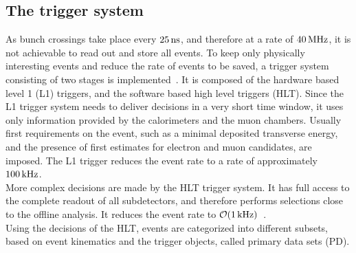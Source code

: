 \subsection{The trigger system}
As bunch crossings take place every $25\,\text{ns}$, and therefore at a rate of $40\,\text{MHz}$, it is not achievable to read out and store all events. To keep only physically interesting events and reduce the rate of events to be saved, a trigger system consisting of two stages is implemented~\cite{TriggerSystem}. It is composed of the hardware based level 1 (L1) triggers, and the software based high level triggers (HLT). Since the L1 trigger system needs to deliver decisions in a very short time window, it uses only information provided by the calorimeters and the muon chambers. Usually first requirements on the event, such as a minimal deposited transverse energy, and  the presence of first estimates for electron and muon candidates, are imposed. The L1 trigger reduces the event rate to a rate of approximately $100\,\text{kHz}$.\\
More complex decisions are made by the HLT trigger system. It has full access to the complete readout of all subdetectors, and therefore performs selections close to the offline analysis. It reduces the event rate to $\mathcal{O}(1\,\text{kHz})$~\cite{TriggerRate}.\\
Using the decisions of the HLT, events are categorized into different subsets, based on event kinematics and the trigger objects, called primary data sets (PD).
